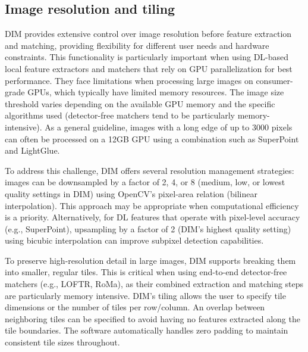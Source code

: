 \subsection{Image resolution and tiling}\label{sec:5:tiling}

DIM provides extensive control over image resolution before feature extraction and matching, providing flexibility for different user needs and hardware constraints. 
This functionality is particularly important when using DL-based local feature extractors and matchers that rely on GPU parallelization for best performance. 
They face limitations when processing large images on consumer-grade GPUs, which typically have limited memory resources. 
The image size threshold varies depending on the available GPU memory and the specific algorithms used (detector-free matchers tend to be particularly memory-intensive). 
As a general guideline, images with a long edge of up to 3000 pixels can often be processed on a 12GB GPU using a combination such as SuperPoint and LightGlue. 

To address this challenge, DIM offers several resolution management strategies: images can be downsampled by a factor of 2, 4, or 8 (medium, low, or lowest quality settings in DIM) using OpenCV's pixel-area relation (bilinear interpolation). 
This approach may be appropriate when computational efficiency is a priority. Alternatively, for DL features that operate with pixel-level accuracy (e.g., SuperPoint), upsampling by a factor of 2 (DIM's highest quality setting) using bicubic interpolation can improve subpixel detection capabilities.  

To preserve high-resolution detail in large images, DIM supports breaking them into smaller, regular tiles.
This is critical when using end-to-end detector-free matchers (e.g., LOFTR, RoMa), as their combined extraction and matching steps are particularly memory intensive. 
DIM's tiling allows the user to specify tile dimensions or the number of tiles per row/column.
An overlap between neighboring tiles can be specified to avoid having no features extracted along the tile boundaries. 
The software automatically handles zero padding to maintain consistent tile sizes throughout. 

